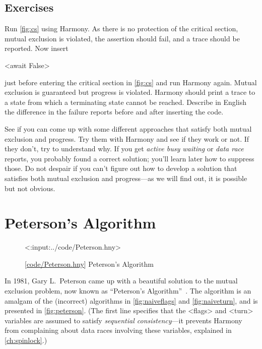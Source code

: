 \documentclass{report}
\newcommand{\harmonylink}[1]{%
[\href{https://harmony.cs.cornell.edu/#1}{\underline{#1}}]%
}
\newenvironment{code}{
\tcolorbox
}{
\endtcolorbox
}
\begin{document}
\section*{Exercises}
\begin{problems}
\item Run \autoref{fig:cs} using Harmony.  As there is no protection of the critical
section, mutual exclusion is violated,
the assertion should fail, and a trace should be reported.
Now insert
\begin{code}
<{await False}>
\end{code}
just before entering the critical section
in \autoref{fig:cs} and run Harmony again.
Mutual exclusion is guaranteed but progress is violated.
Harmony should print a trace
to a state from which a terminating state cannot be reached.
Describe in English the difference in the failure reports before
and after inserting the code.
\item See if you can come up with some different approaches that satisfy both
mutual exclusion and progress.  Try them with Harmony and see if they work or not.
If they don't, try to understand why.
If you get \emph{active busy waiting} or \emph{data race} reports, you probably
found a correct solution; you'll learn later how to suppress those.
Do not despair if you can't figure out how to develop a solution that satisfies both
mutual exclusion and progress---as we will find out, it is possible but not obvious.
\end{problems}

\chapter{Peterson's Algorithm}
\label{ch:peterson}
%

\begin{figure}
\begin{code}
<{:input:../code/Peterson.hny}>
\end{code}
\caption{\harmonylink{code/Peterson.hny} Peterson's Algorithm}
\label{fig:peterson}
\end{figure}

%
In 1981, Gary L.~Peterson came up with a beautiful solution to the mutual exclusion
problem, now known as ``Peterson's Algorithm''~\cite{Peterson81}.
The algorithm is an amalgam of the (incorrect) algorithms in
\autoref{fig:naiveflags} and \autoref{fig:naiveturn}, and is presented
in \autoref{fig:peterson}.
(The first line specifies that the <{flags}> and <{turn}>
variables are assumed to satisfy \emph{sequential consistency}---it prevents
Harmony from complaining about data races involving these variables,
explained in \autoref{ch:spinlock}.)
\end{document}
